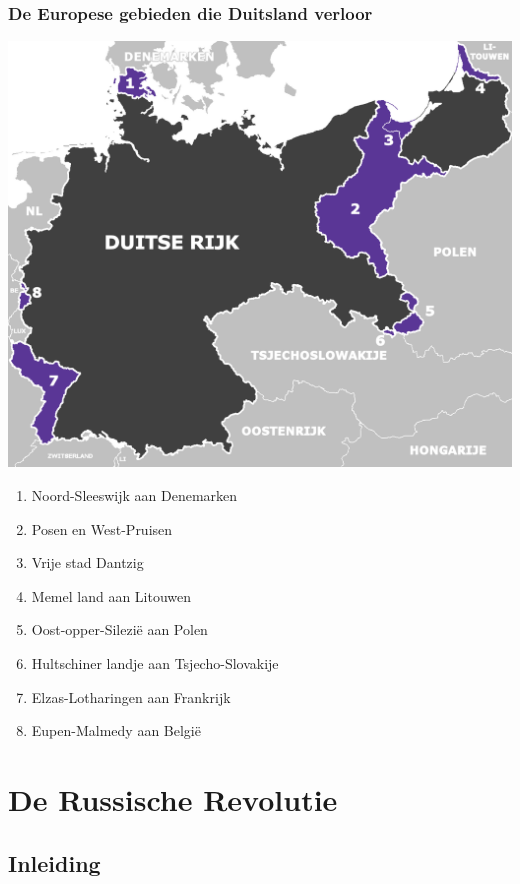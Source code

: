 \documentclass{article}
\begin{document}
\subsubsection{De Europese gebieden die Duitsland verloor}
\includegraphics[scale=0.5]{DuitseRijk.png}
\begin{enumerate}
    \item Noord-Sleeswijk aan Denemarken
    \item Posen en West-Pruisen
    \item Vrije stad Dantzig
    \item Memel land aan Litouwen
    \item Oost-opper-Silezië aan Polen
    \item Hultschiner landje aan Tsjecho-Slovakije
    \item Elzas-Lotharingen aan Frankrijk
    \item Eupen-Malmedy aan België
\end{enumerate}

\newpage
\section{De Russische Revolutie}
\subsection{Inleiding}
\end{document}
